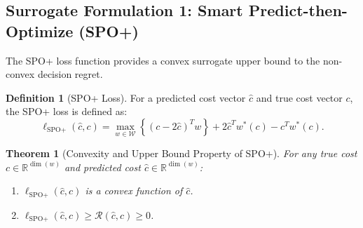 \documentclass[11pt,a4paper]{article}
\newtheorem{theorem}{Theorem}
\theoremstyle{definition}
\newtheorem{definition}{Definition}
\theoremstyle{remark}
\begin{document}
\subsection{Surrogate Formulation 1: Smart Predict-then-Optimize (SPO+)}
The SPO+ loss function \citep{elmachtoub2022smart} provides a convex surrogate upper bound to the non-convex decision regret.

\begin{definition}[SPO+ Loss]
For a predicted cost vector $\hat{c}$ and true cost vector $c$, the SPO+ loss is defined as:
\begin{equation}
    \ell_{\text{SPO}+}(\hat{c}, c) = \max_{w \in \mathcal{W}} \left\{ (c - 2\hat{c})^T w \right\} + 2\hat{c}^T w^*(c) - c^T w^*(c). \label{eq:spop_def}
\end{equation}
\end{definition}

\begin{theorem}[Convexity and Upper Bound Property of SPO+]
\label{thm:spop_properties}
For any true cost $c \in \mathbb{R}^{\dim(w)}$ and predicted cost $\hat{c} \in \mathbb{R}^{\dim(w)}$:
\begin{enumerate}[label=(\roman*)]
    \item $\ell_{\text{SPO}+}(\hat{c}, c)$ is a convex function of $\hat{c}$.
    \item $\ell_{\text{SPO}+}(\hat{c}, c) \ge \mathcal{R}(\hat{c}, c) \ge 0$.
\end{enumerate}
\end{theorem}
\end{document}
